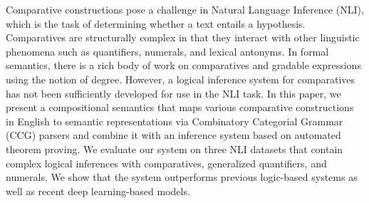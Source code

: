 Comparative constructions pose a challenge in Natural Language Inference (NLI), which is the task of determining whether a text entails a hypothesis. Comparatives are structurally complex in that they interact with other linguistic phenomena such as quantifiers, numerals, and lexical antonyms. In formal semantics, there is a rich body of work on comparatives and gradable expressions using the notion of degree. However, a logical inference system for comparatives has not been sufficiently developed for use in the NLI task. In this paper, we present a compositional semantics that maps various comparative constructions in English to semantic representations via Combinatory Categorial Grammar (CCG) parsers and combine it with an inference system based on automated theorem proving. We evaluate our system on three NLI datasets that contain complex logical inferences with comparatives, generalized quantifiers, and numerals. We show that the system outperforms previous logic-based systems as well as recent deep learning-based models.
